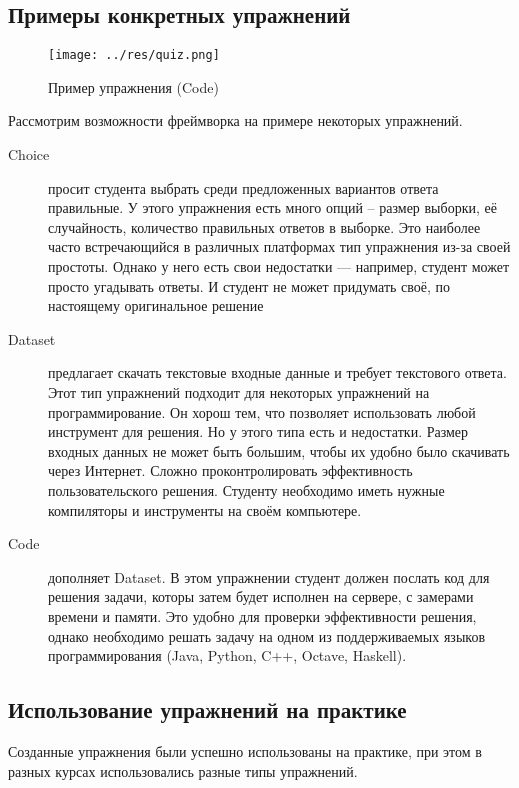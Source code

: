 \documentclass{matmex-diploma-custom}
\begin{document}
\subsection{Примеры конкретных упражнений}
\begin{figure}
  \texttt{[image: ../res/quiz.png]}
  \caption{Пример упражнения (Code)}
\end{figure}

Рассмотрим возможности фреймворка на примере некоторых упражнений.

\begin{description}
\item[Choice] просит студента выбрать среди предложенных вариантов
  ответа правильные. У этого упражнения есть много опций -- размер
  выборки, её случайность, количество правильных ответов в
  выборке. Это наиболее часто встречающийся в различных платформах тип
  упражнения из-за своей простоты. Однако у него есть свои недостатки
  --- например, студент может просто угадывать ответы. И студент не
  может придумать своё, по настоящему оригинальное решение

\item[Dataset] предлагает скачать текстовые входные данные и требует
  текстового ответа. Этот тип упражнений подходит для некоторых
  упражнений на программирование. Он хорош тем, что позволяет
  использовать любой инструмент для решения. Но у этого типа есть и
  недостатки. Размер входных данных не может быть большим, чтобы их
  удобно было скачивать через Интернет. Сложно проконтролировать
  эффективность пользовательского решения. Студенту необходимо иметь
  нужные компиляторы и инструменты на своём компьютере.

\item[Code] дополняет Dataset. В этом упражнении студент должен
  послать код для решения задачи, которы затем будет исполнен на
  сервере, с замерами времени и памяти. Это удобно для проверки
  эффективности решения, однако необходимо решать задачу на одном из
  поддерживаемых языков программирования (Java, Python, C++, Octave,
  Haskell).

\end{description}

\subsection{Использование упражнений на практике}

Созданные упражнения были успешно использованы на практике, при этом в
разных курсах использовались разные типы упражнений.
\end{document}
